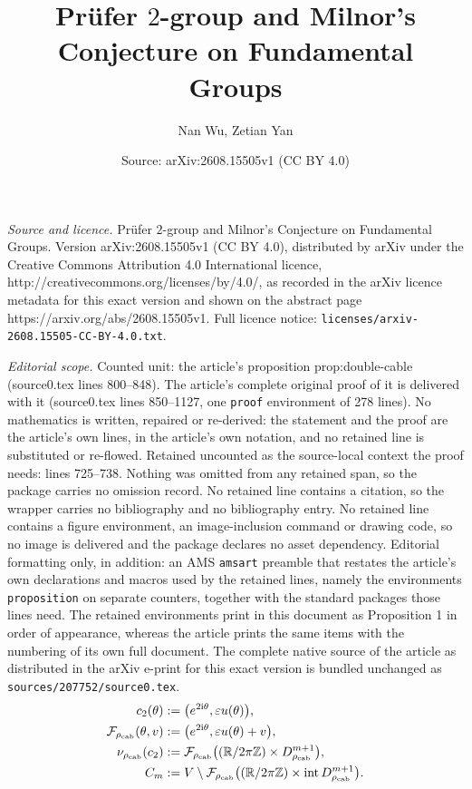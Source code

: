 \documentclass[10pt,a4paper]{amsart}
\title{Pr\"ufer $2$-group and Milnor's Conjecture on Fundamental Groups}
\author{Nan Wu, Zetian Yan}
\date{Source: arXiv:2608.15505v1 (CC BY 4.0)}
\newcommand{\rhoCab}{{\rho_{\mathrm{cab}}}}
\begin{document}
\maketitle

\noindent\emph{Source and licence.} Pr\"ufer $2$-group and Milnor's Conjecture on Fundamental Groups. Version arXiv:2608.15505v1 (CC BY 4.0), distributed by arXiv under the Creative Commons Attribution 4.0 International licence, http://creativecommons.org/licenses/by/4.0/, as recorded in the arXiv licence metadata for this exact version and shown on the abstract page https://arxiv.org/abs/2608.15505v1. Full licence notice: \texttt{licenses/arxiv-2608.15505-CC-BY-4.0.txt}.\par\smallskip

\noindent\textit{Editorial scope.} Counted unit: the article's proposition prop:double-cable (source0.tex lines 800--848). The article's complete original proof of it is delivered with it (source0.tex lines 850--1127, one \texttt{proof} environment of 278 lines). No mathematics is written, repaired or re-derived: the statement and the proof are the article's own lines, in the article's own notation, and no retained line is substituted or re-flowed.  Retained uncounted as the source-local context the proof needs: lines 725--738.  Nothing was omitted from any retained span, so the package carries no omission record.  No retained line contains a citation, so the wrapper carries no bibliography and no bibliography entry.  No retained line contains a figure environment, an image-inclusion command or drawing code, so no image is delivered and the package declares no asset dependency.  Editorial formatting only, in addition: an AMS \texttt{amsart} preamble that restates the article's own declarations and macros used by the retained lines, namely the environments \texttt{proposition} on separate counters, together with the standard packages those lines need.  The retained environments print in this document as Proposition 1 in order of appearance, whereas the article prints the same items with the numbering of its own full document.  The complete native source of the article as distributed in the arXiv e-print for this exact version is bundled unchanged as \texttt{sources/207752/source0.tex}.
\begin{align}
 c_2(\theta)
   &:=\bigl(e^{2\mathrm i\theta},\varepsilon u(\theta)\bigr),\label{eq:double-cable}\\
 \mathcal F_{\rhoCab}(\theta,v)
   &:=\bigl(e^{2\mathrm i\theta},\varepsilon u(\theta)+v\bigr),\label{eq:explicit-tube}\\
 \nu_{\rhoCab}(c_2)
   &:=\mathcal F_{\rhoCab}
     \bigl((\mathbb R/2\pi\mathbb Z)\times
                     D^{m+1}_{\rhoCab}\bigr),\notag\\
 C_m
   &:=V\setminus\mathcal F_{\rhoCab}
     \bigl((\mathbb R/2\pi\mathbb Z)\times
              \operatorname{int}D^{m+1}_{\rhoCab}\bigr).\label{eq:explicit-exterior}
\end{align}
\end{document}
